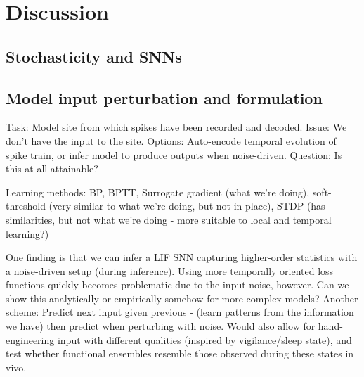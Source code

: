 \documentclass[mphil,deptreport,ianc]{infthesis} %
\begin{document}



\section{Discussion}

\subsection{Stochasticity and SNNs}


\subsection{Model input perturbation and formulation}

Task: Model site from which spikes have been recorded and decoded. Issue: We don’t have the input to the site. Options: Auto-encode temporal evolution of spike train, or infer model to produce outputs when noise-driven. Question: Is this at all attainable?

Learning methods:
BP, BPTT, Surrogate gradient (what we’re doing), soft-threshold (very similar to what we’re doing, but not in-place), STDP (has similarities, but not what we’re doing - more suitable to local and temporal learning?)

One finding is that we can infer a LIF SNN capturing higher-order statistics with a noise-driven setup (during inference). Using more temporally oriented loss functions quickly becomes problematic due to the input-noise, however. Can we show this analytically or empirically somehow for more complex models?
Another scheme: Predict next input given previous - (learn patterns from the information we have) then predict when perturbing with noise. Would also allow for hand-engineering input with different qualities (inspired by vigilance/sleep state), and test whether functional ensembles resemble those observed during these states in vivo.
\end{document}
